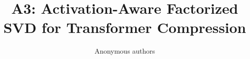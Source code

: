 \title{\textbf{A3: Activation-Aware Factorized SVD for Transformer Compression}}

\author{Anonymous authors}
